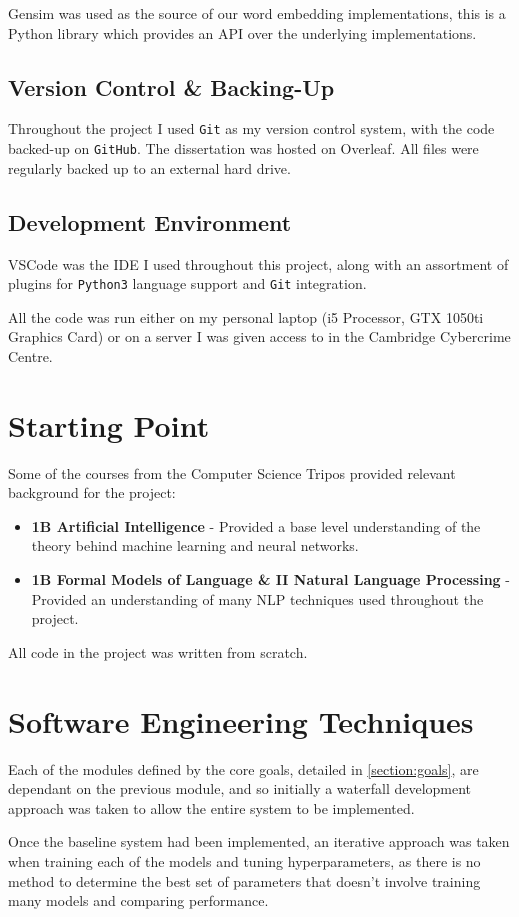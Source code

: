 \documentclass[12pt,a4paper,twoside,openright]{report}
\begin{document}
Gensim was used as the source of our word embedding implementations, this is a Python library which provides an API over the underlying implementations. 

\subsection{Version Control \& Backing-Up}
Throughout the project I used \texttt{Git} as my version control system, with the code backed-up on \texttt{GitHub}. The dissertation was hosted on Overleaf. All files were regularly backed up to an external hard drive.

\subsection{Development Environment}
VSCode was the IDE I used throughout this project, along with an assortment of plugins for \texttt{Python3} language support and \texttt{Git} integration.

All the code was run either on my personal laptop (i5 Processor, GTX 1050ti Graphics Card) or on a server I was given access to in the Cambridge Cybercrime Centre.

\section{Starting Point}
Some of the courses from the Computer Science Tripos provided relevant background for the project:
\begin{itemize}
    \item \textbf{1B Artificial Intelligence} - Provided a base level understanding of the theory behind machine learning and neural networks.
    \item \textbf{1B Formal Models of Language \& II Natural Language Processing} - Provided an understanding of many NLP techniques used throughout the project.
\end{itemize}
All code in the project was written from scratch.

\section{Software Engineering Techniques}
Each of the modules defined by the core goals, detailed in \ref{section:goals}, are dependant on the previous module, and so initially a waterfall development approach was taken to allow the entire system to be implemented. 

Once the baseline system had been implemented, an iterative approach was taken when training each of the models and tuning hyperparameters, as there is no method to determine the best set of parameters that doesn't involve training many models and comparing performance. 
\end{document}
